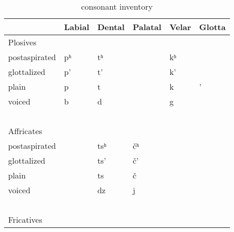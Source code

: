 \documentclass[output=paper]{LSP/langsci}
\begin{document}
\begin{table}[p]
\caption{ consonant inventory} \label{yuchiinventory}
    \begin{tabular}{llllll}\lsptoprule
    ~                           & Labial    &  Dental      &  Palatal        &  Velar      & Glotta  \\
    \midrule
     Plosives            & ~                   & ~                    & ~                       & ~                   & ~                \\
    postaspirated               & pʰ & tʰ  & ~                       & kʰ & ~                \\
    glottalized                 & p'                  & t'                   & ~                       & k'                  & ~                \\
    plain                       & p                   & t                    & ~                       & k                   & '                \\
    voiced                      & b                   & d                    & ~                       & g                   & ~                \\
    ~                           & ~                   & ~                    & ~                       & ~                   & ~                \\
    Affricates        & ~                   & ~                    & ~                       & ~                   & ~                \\
    postaspirated               & ~                   & tsʰ & \v{c}ʰ & ~                   & ~                \\
    glottalized                 & ~                   & ts'                  & \v{c}'                  & ~                   & ~                \\
    plain                       & ~                   & ts                   & \v{c}                   & ~                   & ~                \\
    voiced                      & ~                   & dz                   & j                  & ~                   & ~                \\
    ~                           & ~                   & ~                    & ~                       & ~                   & ~                \\
    Fricatives         & ~                   & ~                    & ~                       & ~                   & ~                \\

\end{tabular}
\end{table}
\end{document}
